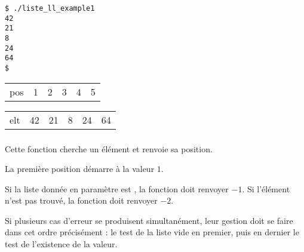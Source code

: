 \begin{table}[ht!]
  \centering
  \begin{minipage}{0.45\textwidth}
    \centering

\lstset{language=sh}
\begin{lstlisting}[frame=single]
$ ./liste_ll_example1
42
21
8
24
64
$
\end{lstlisting}

  \end{minipage}
  \hfillx
  \begin{minipage}{0.45\textwidth}
    \centering

\begin{tabular}{m{1cm} C{0.5cm} C{0.5cm} C{0.5cm} C{0.5cm} C{0.5cm} }
pos & 1 & 2 & 3 & 4 & 5 \\
\end{tabular}

\begin{tabular}{m{1cm}|C{0.5cm}|C{0.5cm}|C{0.5cm}|C{0.5cm}|C{0.5cm}|}
elt & 42 & 21 & 8 & 24 & 64 \\
\end{tabular}

  \end{minipage}
\end{table}

\vspace*{-0.5cm}


\subsubsection*{}

\noindent Cette fonction cherche un élément et renvoie sa position.

\smallskip

\noindent La première position démarre à la valeur $ 1 $.

\smallskip

\noindent Si la liste donnée en paramètre est , la fonction doit renvoyer $ -1 $.
Si l'élément n'est pas trouvé, la fonction doit renvoyer $ -2 $.

\smallskip

\noindent Si plusieurs cas d'erreur se produisent simultanément, leur gestion doit se faire dans cet ordre précisément : le test de la liste vide en premier, puis en dernier le test de l'existence de la valeur.

\bigskip


